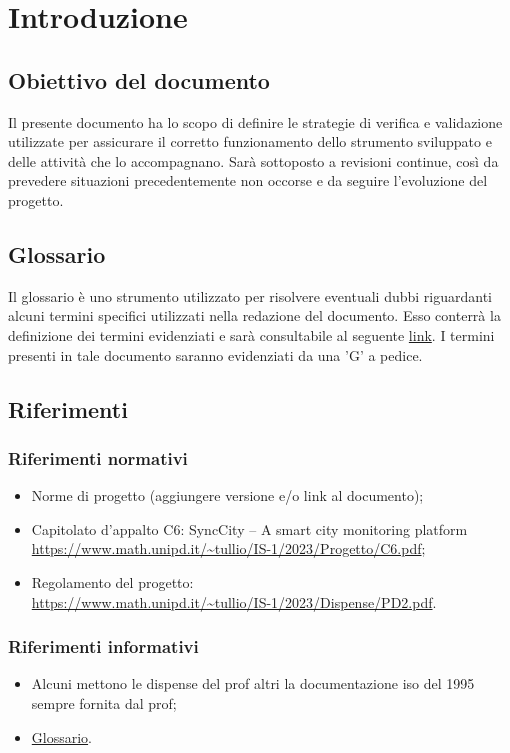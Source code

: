 \section{Introduzione}
\subsection{Obiettivo del documento}
Il presente documento ha lo scopo di definire le strategie di verifica e validazione utilizzate per assicurare il corretto funzionamento dello strumento sviluppato e delle
attività che lo accompagnano.  Sarà sottoposto a revisioni continue, così da prevedere situazioni precedentemente non occorse e da seguire l'evoluzione del progetto.
\subsection{Glossario}
Il glossario è uno strumento utilizzato per risolvere eventuali dubbi riguardanti 
alcuni termini specifici utilizzati nella redazione del documento.
Esso conterrà la definizione dei termini evidenziati e sarà consultabile al seguente \href{https://7last.github.io/docs/rtb/documentazione-interna/glossario}{link}. I termini presenti in tale documento saranno evidenziati da una 'G' a pedice.
\subsection{Riferimenti}
\subsubsection{Riferimenti normativi}
\begin{itemize}
    \item Norme di progetto (aggiungere versione e/o link al documento);
    \item Capitolato d'appalto C6: SyncCity – A smart city monitoring platform\\
		  \url{https://www.math.unipd.it/~tullio/IS-1/2023/Progetto/C6.pdf};
    \item Regolamento del progetto:\\
		  \url{https://www.math.unipd.it/~tullio/IS-1/2023/Dispense/PD2.pdf}.
\end{itemize}
\subsubsection{Riferimenti informativi}
\begin{itemize}
    \item Alcuni mettono le dispense del prof altri la documentazione iso del 1995 
			sempre fornita dal prof;
    \item \href{https://7last.github.io/docs/rtb/documentazione-interna/glossario}{Glossario}.
\end{itemize}
